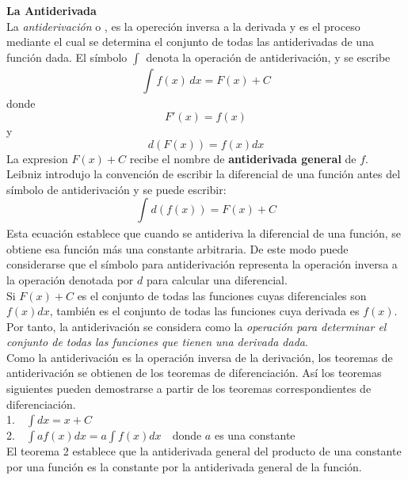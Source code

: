 \documentclass[11pt]{report}
\begin{document}
\pagebreak \textbf {La Antiderivada}\\[2mm]
\hspace*{10mm}La \textit{antiderivación} o , es la opereción inversa a la derivada y es el proceso mediante el cual se determina el conjunto de todas las antiderivadas de una función dada. El símbolo $\int_{}^{}$ denota la operación de antiderivación, y se escribe
$$\int_{}^{}f(x)\, dx=F(x)+C$$
\hspace*{50mm}donde
$$F'(x)=f(x)$$
\hspace*{50mm}y
$$d(F(x))=f(x)dx$$
La expresion $F(x)+C$ recibe el nombre de \textbf{antiderivada general} de $f$.\\[2mm]
\hspace*{10mm}Leibniz introdujo la convención de escribir la diferencial de una función antes del símbolo de antiderivación y se puede escribir:
$$\int_{}^{}d(f(x))=F(x)+C$$
Esta ecuación establece que cuando se antideriva la diferencial de una función, se obtiene esa función más una constante arbitraria. De este modo puede considerarse que el símbolo para antiderivación representa la operación inversa a la operación denotada por $d$ para calcular una diferencial.\\[2mm]
\hspace*{10mm}Si ${F(x)+C}$ es el conjunto de todas las funciones cuyas diferenciales son $f(x)dx$, también es el conjunto de todas las funciones cuya derivada es $f(x)$. Por tanto, la antiderivación se considera como la \textit{operación para determinar el conjunto de todas las funciones que tienen una derivada dada}.\\[2mm]
\hspace*{10mm}Como la antiderivación es la operación inversa de la derivación, los teoremas  de antiderivación se obtienen de los teoremas de diferenciación. Así los teoremas siguientes pueden demostrarse a partir de los teoremas correspondientes de diferenciación.\\[2mm]
\hspace*{10mm}1.$\quad\displaystyle\int dx=x+C$\\[2mm]
\hspace*{10mm}2.$\quad\displaystyle\int af(x) dx=a\int f(x) dx\quad$donde $a$ es una constante\\[2mm]
\hspace*{10mm}El teorema 2 establece que la antiderivada general del producto de una constante por una función es la constante por la antiderivada general de la función.\\[2mm]
\end{document}
